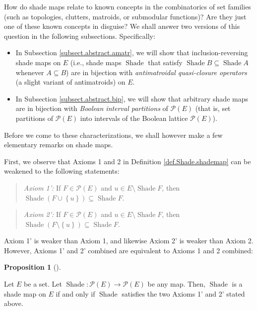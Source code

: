 \documentclass[numbers=enddot,12pt,final,onecolumn]{scrartcl}%
\theoremstyle{definition}
\newtheorem{prop}[theo]{Proposition}
\newenvironment{proposition}[1][]
{\begin{prop}[#1]\begin{leftbar}}
{\end{leftbar}\end{prop}}
\newenvironment{statement}{\begin{quote}}{\end{quote}}
\begin{document}
How do shade maps relate to known concepts in the combinatorics of set
families (such as topologies, clutters, matroids, or submodular functions)?
Are they just one of these known concepts in disguise? We shall answer two
versions of this question in the following subsections. Specifically:

\begin{itemize}
\item In Subsection \ref{subsect.abstract.amatr}, we will show that
inclusion-reversing shade maps on $E$ (i.e., shade maps $\operatorname*{Shade}%
$ that satisfy $\operatorname*{Shade}B\subseteq\operatorname*{Shade}A$
whenever $A\subseteq B$) are in bijection with \emph{antimatroidal
quasi-closure operators} (a slight variant of antimatroids) on $E$.

\item In Subsection \ref{subsect.abstract.bip}, we will show that arbitrary
shade maps are in bijection with \emph{Boolean interval partitions} of
$\mathcal{P}\left(  E\right)  $ (that is, set partitions of $\mathcal{P}%
\left(  E\right)  $ into intervals of the Boolean lattice $\mathcal{P}\left(
E\right)  $).
\end{itemize}

Before we come to these characterizations, we shall however make a few
elementary remarks on shade maps.

First, we observe that Axioms 1 and 2 in Definition \ref{def.Shade.shademap}
can be weakened to the following statements:

\begin{statement}
\textit{Axiom 1':} If $F\in\mathcal{P}\left(  E\right)  $ and $u\in
E\setminus\operatorname*{Shade}F$, then $\operatorname*{Shade}\left(
F\cup\left\{  u\right\}  \right)  \subseteq\operatorname*{Shade}F$.
\end{statement}

\begin{statement}
\textit{Axiom 2':} If $F\in\mathcal{P}\left(  E\right)  $ and $u\in
E\setminus\operatorname*{Shade}F$, then $\operatorname*{Shade}\left(
F\setminus\left\{  u\right\}  \right)  \subseteq\operatorname*{Shade}F$.
\end{statement}

Axiom 1' is weaker than Axiom 1, and likewise Axiom 2' is weaker than Axiom 2.
However, Axioms 1' and 2' combined are equivalent to Axioms 1 and 2 combined:

\begin{proposition}
\label{prop.Shade.shade-2}Let $E$ be a set. Let $\operatorname*{Shade}%
:\mathcal{P}\left(  E\right)  \rightarrow\mathcal{P}\left(  E\right)  $ be any
map. Then, $\operatorname*{Shade}$ is a shade map on $E$ if and only if
$\operatorname*{Shade}$ satisfies the two Axioms 1' and 2' stated above.
\end{proposition}
\end{document}
